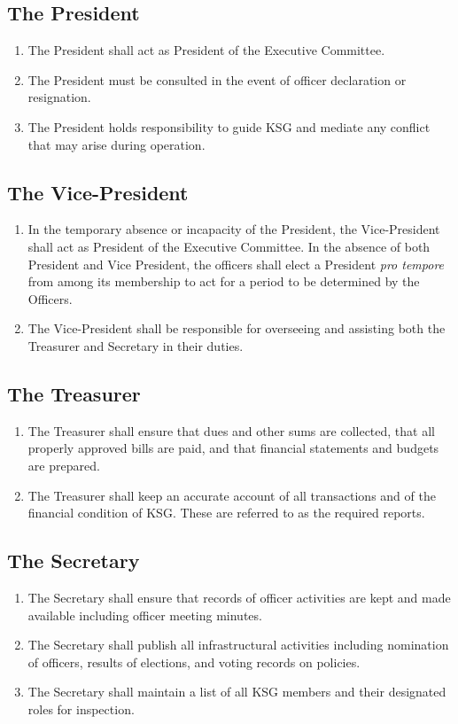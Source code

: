 \documentclass[12pt,executivepaper]{article}
\begin{document}
\subsection{The President}
\begin{enumerate}
    \item The President shall act as President of the Executive Committee.
    \item The President must be consulted in the event of officer declaration or
          resignation.
    \item The President holds responsibility to guide KSG and mediate any conflict
          that may arise during operation.
\end{enumerate}

\subsection{The Vice-President}
\begin{enumerate}
    \item In the temporary absence or incapacity of the President, the Vice-President
          shall act as President of the Executive Committee. In the absence of both
          President and Vice President, the officers shall elect a President
          \textit{pro tempore} from among its membership to act for a period to be
          determined by the Officers.
    \item The Vice-President shall be responsible for overseeing and assisting both
          the Treasurer and Secretary in their duties.
\end{enumerate}

\subsection{The Treasurer}
\begin{enumerate}
    \item The Treasurer shall ensure that dues and other sums are collected, that all
          properly approved bills are paid, and that financial statements and budgets
          are prepared.
    \item The Treasurer shall keep an accurate account of all transactions and of the
          financial condition of KSG. These are referred to as the required reports.
\end{enumerate}

\subsection{The Secretary}
\begin{enumerate}
    \item The Secretary shall ensure that records of officer activities are kept and made
          available including officer meeting minutes.
    \item The Secretary shall publish all infrastructural activities including nomination
          of officers, results of elections, and voting records on policies.
    \item The Secretary shall maintain a list of all KSG members and their designated roles
          for inspection.
\end{enumerate}
\end{document}
